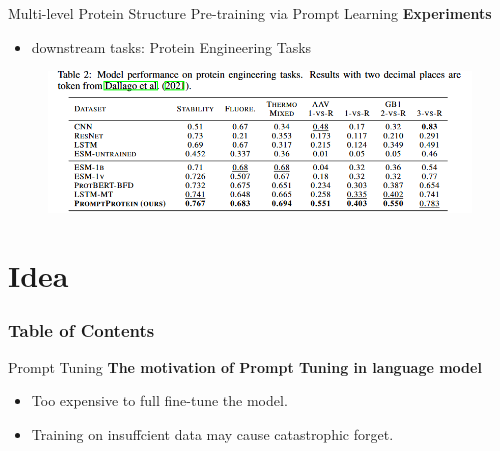 \documentclass[notheorems, aspectratio=54]{beamer}
\begin{document}
\begin{frame}{Multi-level Protein Structure Pre-training via Prompt Learning}
  \textbf{Experiments}

  \begin{itemize}
  \item downstream tasks: Protein Engineering Tasks
  \end{itemize}

  \begin{figure}[!h]
    \centering
    \includegraphics[width=0.9\linewidth]{figures/MPH-tab2.png}
  \end{figure}

\end{frame}




\section{Idea}
\begin{frame}
    \frametitle{Table of Contents}
    \tableofcontents[currentsection]
\end{frame}



\begin{frame}{Prompt Tuning}
  \textbf{The motivation of Prompt Tuning in language model}
  \begin{itemize}
    \item Too expensive to full fine-tune the model.  
    \item Training on insuffcient data may cause catastrophic forget.  
  \end{itemize}
\end{frame}
\end{document}
